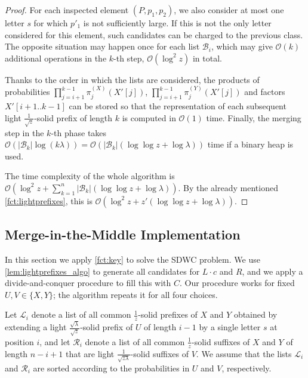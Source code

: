 \documentclass{article}
\theoremstyle{plain}
\theoremstyle{definition}
\newcommand{\SDWC}{\textsc{SDWC}\xspace}
\newcommand{\Oh}{\mathcal{O}}
\newcommand{\B}{\mathcal{B}}
\renewcommand{\L}{\mathcal{L}}
\newcommand{\R}{\mathcal{R}}
\newcommand{\fr}{\ensuremath{\frac1z}}
\newcommand{\frsq}{$\frac{1}{\sqrt{z}}$}
\newcommand{\mayqed}{}
\begin{document}
\begin{proof}
        For each inspected element $(P,p_1,p_2)$, we also consider at most one letter $s$ for which $p'_1$ is not sufficiently large.
        If this is not the only letter considered for this element, such candidates can be charged to the previous class.
        The opposite situation may happen once for each list $\B_i$, which may give $\Oh(k)$ additional operations in the $k$-th step,
        $\Oh(\log^2 z)$ in total.
        
        Thanks to the order in which the lists are considered, the products of probabilities
        $\prod_{j=i+1}^{k-1} \pi^{(X)}_j(X'[j])$, $\prod_{j=i+1}^{k-1} \pi^{(Y)}_j(X'[j])$ and factors $X'[i+1..k-1]$ can be stored
        so that the representation of each subsequent light \frsq-solid prefix of length $k$ is computed in $\Oh(1)$ time.
        Finally, the merging step in the $k$-th phase takes $\Oh(|\B_k|\log(k\lambda)) = \Oh(|\B_k| (\log \log z+\log \lambda))$ time
        if a binary heap is used.

        The time complexity of the whole algorithm is $\Oh(\log^2 z + \sum_{k=1}^{n}|\B_k| (\log \log z+\log \lambda))$.
        By the already mentioned \cref{fct:lightprefixes}, this is $\Oh(\log^2 z+z' (\log \log z+\log \lambda))$.
      \mayqed\end{proof}

    \subsection{Merge-in-the-Middle Implementation}
    In this section we apply \cref{fct:key} to solve the \SDWC problem.
    We use \cref{lem:lightprefixes_algo} to generate all candidates for $L\cdot c$ and $R$,
    and we apply a divide-and-conquer procedure to fill this with $C$.
    Our procedure works for fixed $U,V\in \{X,Y\}$; the algorithm repeats it for all four choices.
    
      Let $\L_i$ denote a list of all common \fr-solid prefixes of $X$ and $Y$ obtained by extending
      a light $\frac{\sqrt{\lambda}}{\sqrt{z}}$-solid prefix of $U$ of length $i-1$ by a single letter $s$ at position $i$,
      and let $\R_i$ denote a list of all common $\frac{1}{z}$-solid suffixes of $X$ and $Y$ of length $n-i+1$ that are light $\frac1{\sqrt{z\lambda}}$-solid suffixes of $V$.  We assume that the lists $\L_i$ and $\R_i$ are sorted according to the probabilities in $U$ and $V$, respectively.
\end{document}
